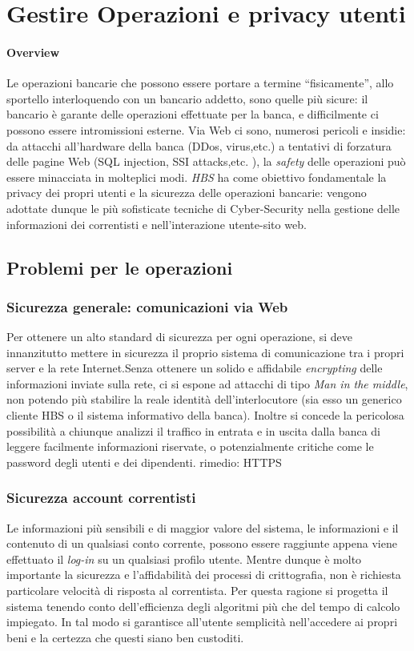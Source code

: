 
\section{Gestire Operazioni e privacy utenti}
\paragraph{Overview} Le operazioni bancarie che possono essere portare a termine ``fisicamente'', allo sportello interloquendo con un bancario addetto,  sono quelle più sicure: il bancario è garante delle operazioni effettuate per la banca, e difficilmente  ci possono essere intromissioni esterne.
 Via Web ci sono, numerosi pericoli e insidie: da attacchi all'hardware della banca (DDos, virus,etc.) a tentativi di forzatura delle pagine Web (SQL injection, SSI attacks,etc. ), la \emph{safety} delle operazioni può essere minacciata in molteplici modi.
\emph{HBS} ha come obiettivo fondamentale la privacy dei propri utenti e la sicurezza delle operazioni bancarie: vengono adottate dunque le più sofisticate tecniche di Cyber-Security nella gestione delle informazioni dei correntisti  e nell'interazione utente-sito web.

\subsection{Problemi per le operazioni}

	\subsubsection{Sicurezza generale: comunicazioni via Web}
Per ottenere un alto standard di sicurezza per ogni operazione, si deve innanzitutto mettere in sicurezza il proprio sistema di comunicazione tra i propri server e la rete Internet.Senza ottenere un solido e affidabile \emph{encrypting} delle informazioni inviate sulla rete, ci si espone ad attacchi di tipo \emph{Man in the middle}, non potendo più stabilire la reale identità dell'interlocutore (sia esso un generico cliente HBS o il sistema informativo della banca). Inoltre si concede la pericolosa possibilità a chiunque analizzi il traffico in entrata e in uscita dalla banca di leggere facilmente informazioni riservate, o potenzialmente critiche come le password degli utenti e dei dipendenti.
rimedio: HTTPS


	\subsubsection{Sicurezza account correntisti}
Le informazioni più sensibili e di maggior valore del sistema, le informazioni e il contenuto di un qualsiasi conto corrente, possono essere raggiunte appena viene effettuato il \emph{log-in} su un qualsiasi profilo utente. Mentre dunque è molto importante la sicurezza e l'affidabilità dei processi di crittografia, non è richiesta particolare velocità di risposta al correntista. Per questa ragione si progetta il sistema tenendo conto dell'efficienza degli algoritmi più che del tempo di calcolo impiegato.
In tal modo si garantisce all'utente semplicità nell'accedere ai propri beni e la certezza che questi siano ben custoditi.


